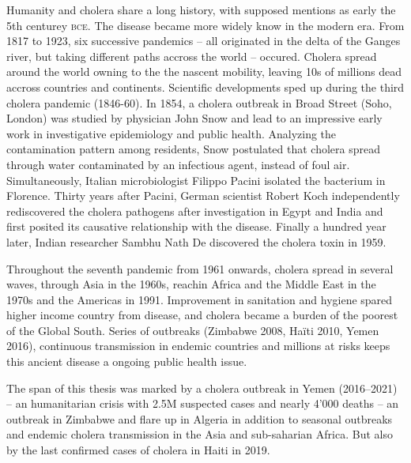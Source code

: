 Humanity and cholera share a long history, with supposed mentions as early the 5th centurey \textsc{bce}. The disease became more widely know in the modern era. From 1817 to 1923, six successive pandemics -- all originated in the delta of the Ganges river, but taking different paths accross the world -- occured. Cholera spread around the world owning to the the nascent mobility, leaving 10s of millions dead accross countries and continents.  Scientific developments sped up during the third cholera pandemic (1846-60). In 1854, a cholera outbreak in Broad Street (Soho, London) was studied by physician John Snow and lead to an impressive early work in investigative epidemiology and public health. Analyzing the contamination pattern among residents, Snow postulated that cholera spread through water contaminated by an infectious agent, instead of foul air.  Simultaneously, Italian microbiologist Filippo Pacini isolated the bacterium in Florence. Thirty years after Pacini, German scientist Robert Koch independently rediscovered the cholera pathogens after investigation in Egypt and India and first posited its causative relationship with the disease. Finally a hundred year later, Indian researcher Sambhu Nath De discovered the cholera toxin in 1959.

Throughout the seventh pandemic from 1961 onwards, cholera spread in several waves, through Asia in the 1960s, reachin Africa and the Middle East in the 1970s and the Americas in 1991\cite{Mutreja:EvidenceSeveralWaves:2011}. Improvement in sanitation and hygiene spared higher income country from disease, and cholera became a burden of the poorest of the Global South. Series of outbreaks (\eg Zimbabwe 2008, Haïti 2010, Yemen 2016), continuous transmission in endemic countries and millions at risks keeps this ancient disease a ongoing public health issue.

The span of this thesis was marked by a cholera outbreak in Yemen (2016--2021) -- an humanitarian crisis with 2.5M suspected cases and nearly 4'000 deaths -- an outbreak in Zimbabwe and flare up in Algeria in addition to seasonal outbreaks and endemic cholera transmission in the Asia and sub-saharian Africa.  But also by the last confirmed cases of cholera in Haiti in 2019.

